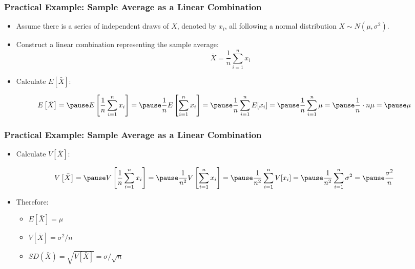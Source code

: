 \documentclass[handout]{beamer} %
\begin{document}
\begin{frame} %
\frametitle{Practical Example: Sample Average as a Linear Combination}

\begin{itemize}
    \item Assume there is a series of independent draws of $X$, denoted by $x_i$, all following a normal distribution $X \sim N(\mu, \sigma^2)$.
  \pause
    \item Construct a linear combination representing the sample average:
    \[
    \bar{X} = \frac{1}{n} \sum_{i=1}^n x_i
    \]
  \pause
    \item Calculate $E[\bar{X}]$:
  \pause
\end{itemize}
\begin{adjustwidth}{-0.5cm}{0cm}
    \[
    E\left[\bar{X}\right] =
  \pause E\left[\frac{1}{n} \sum_{i=1}^n x_i\right] =
  \pause \frac{1}{n} E\left[\sum_{i=1}^n x_i \right] =
  \pause \frac{1}{n} \sum_{i=1}^n E[x_i] =
  \pause \frac{1}{n} \sum_{i=1}^n \mu =
  \pause \frac{1}{n} \cdot n \mu =
  \pause \mu
    \]
\end{adjustwidth}


\end{frame}

\begin{frame} %
\frametitle{Practical Example: Sample Average as a Linear Combination}
\begin{itemize}
    \item Calculate $V[\bar{X}]$:
\end{itemize}
  \pause
\begin{adjustwidth}{-0.5cm}{0cm}
 $$V\left[\bar{X}\right] =
    \pause V\left[\frac{1}{n} \sum_{i=1}^n x_i\right] =
    \pause \frac{1}{n^2} V\left[ \sum_{i=1}^n x_i \right] =
    \pause \frac{1}{n^2} \sum_{i=1}^n V[x_i] =
    \pause \frac{1}{n^2} \sum_{i=1}^n \sigma^2 =
    \pause \frac{\sigma^2}{n} $$
\end{adjustwidth}

\begin{itemize}
    \item Therefore:\pause

    \begin{itemize}
        \item $E[\bar{X}] = \mu$ \pause
        \item $V[\bar{X}] = \sigma^2 / n$\pause
        \item $SD(\bar{X}) = \sqrt{V[\bar{X}]}  = \sigma / \sqrt{n}$
    \end{itemize}
\end{itemize}

\end{frame}
\end{document}
